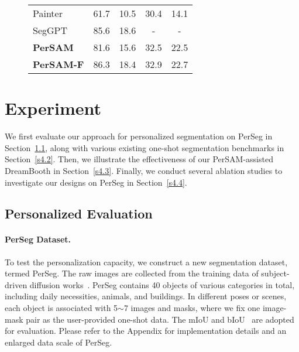 \documentclass{article} \usepackage{iclr2024_conference,times}
\begin{document}
\begin{figure*}
\begin{minipage}[t!]{0.63\linewidth}
\begin{adjustbox}{width=\linewidth}
\begin{tabular}{lcccc}
      \cmidrule(lr){1-5}
      Painter & 61.7 & 10.5 & 30.4 & 14.1 \\
      SegGPT & 85.6 & 18.6 & - & - \vspace{0.05cm}\\
     \rowcolor{pink!12} \bf PerSAM & 81.6 & 15.6 & 32.5 & 22.5\\
      \rowcolor{pink!12}\bf PerSAM-F & 86.3 & 18.4 & 32.9 & 22.7 \\
	  \bottomrule
	\end{tabular}
\end{adjustbox}
\end{minipage}
\end{figure*}

\section{Experiment}
\vspace{-0.1cm}

We first evaluate our approach for personalized segmentation on PerSeg in Section~\ref{s4.1}, along with various existing one-shot segmentation benchmarks in Section~\ref{s4.2}. Then, we illustrate the effectiveness of our PerSAM-assisted DreamBooth in Section~\ref{s4.3}.
Finally, we conduct several ablation studies to investigate our designs on PerSeg in Section~\ref{s4.4}.

\subsection{Personalized Evaluation}
\label{s4.1}

\paragraph{PerSeg Dataset.}
To test the personalization capacity, we construct a new segmentation dataset, termed PerSeg. The raw images are collected from the training data of subject-driven diffusion works~\citep{ruiz2022dreambooth,gal2022image,kumari2022multi}. PerSeg contains 40 objects of various categories in total, including daily necessities, animals, and buildings. In different poses or scenes, each object is associated with 5$\sim$7 images and masks, where we fix one image-mask pair as the user-provided one-shot data. The mIoU and bIoU~\citep{cheng2021boundary} are adopted for evaluation. Please refer to the Appendix for implementation details and an enlarged data scale of PerSeg.
\vspace{-0.1cm}
\end{document}
